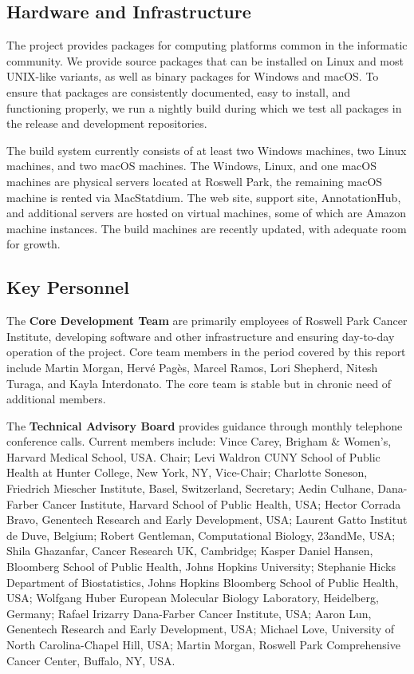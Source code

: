 \documentclass[letterpaper]{article}
\begin{document}
\subsection{Hardware and Infrastructure}
\label{sec:pkg_building}

The \Bioconductor{} project provides packages for computing platforms
common in the informatic community.  We provide source packages
that can be installed on Linux and most UNIX-like variants, as well as
binary packages for Windows and macOS.  To ensure that packages are
consistently documented, easy to install, and functioning properly, we
run a nightly build during which we test all packages in the release
and development repositories.  

The build system currently consists of at least two Windows machines,
two Linux machines, and two macOS machines. The Windows, Linux, and
one macOS machines are physical servers located at Roswell Park, the
remaining macOS machine is rented via MacStatdium. The web site,
support site, AnnotationHub, and additional servers are hosted on
virtual machines, some of which are Amazon machine instances. The
build machines are recently updated, with adequate room for growth.

\subsection{Key Personnel}
\label{sec:key_personnel}

The \textbf{Core Development Team} are primarily employees of Roswell
Park Cancer Institute, developing software and other infrastructure
and ensuring day-to-day operation of the project. Core team members in
the period covered by this report include Martin Morgan, Herv\'{e}
Pag\`{e}s, Marcel Ramos, Lori Shepherd, Nitesh Turaga,
and Kayla Interdonato. The core team is stable but in chronic
need of additional members.

The \textbf{Technical Advisory Board} provides guidance through
monthly telephone conference calls. Current members include: Vince
Carey, Brigham \& Women’s, Harvard Medical School, USA. Chair; Levi
Waldron CUNY School of Public Health at Hunter College, New York, NY,
Vice-Chair; Charlotte Soneson, Friedrich Miescher Institute, Basel,
Switzerland, Secretary; Aedin Culhane, Dana-Farber Cancer Institute,
Harvard School of Public Health, USA; Hector Corrada Bravo, Genentech
Research and Early Development, USA; Laurent Gatto Institut de Duve,
Belgium; Robert Gentleman, Computational Biology, 23andMe, USA; Shila
Ghazanfar, Cancer Research UK, Cambridge; Kasper Daniel Hansen,
Bloomberg School of Public Health, Johns Hopkins University; Stephanie
Hicks Department of Biostatistics, Johns Hopkins Bloomberg School of
Public Health, USA; Wolfgang Huber European Molecular Biology
Laboratory, Heidelberg, Germany; Rafael Irizarry Dana-Farber Cancer
Institute, USA; Aaron Lun, Genentech Research and Early Development,
USA; Michael Love, University of North Carolina-Chapel Hill, USA;
Martin Morgan, Roswell Park Comprehensive Cancer Center, Buffalo, NY,
USA.
\end{document}
